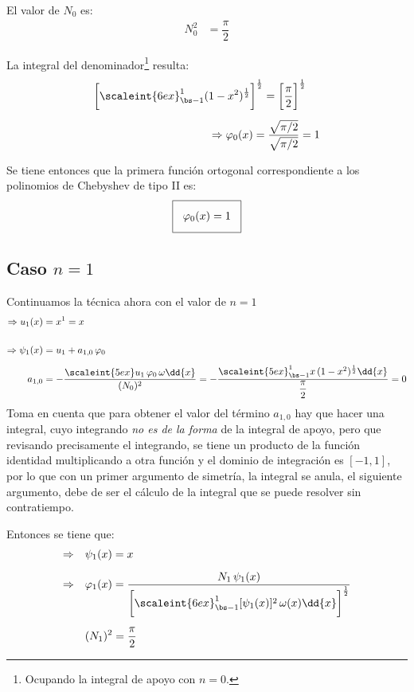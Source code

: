 El valor de $N_{0}$ es:
\begin{align*}
N_{0}^{2} &= \dfrac{\pi}{2}
\end{align*}

La integral del denominador\footnote{Ocupando la integral de apoyo con $n = 0$.} resulta:
\begin{align*}
\bigg[ \scaleint{6ex}_{\bs -1}^{1} (&1 - x^{2})^{\frac{1}{2}} \bigg]^{\frac{1}{2}} =  \bigg[ \dfrac{\pi}{2} \bigg]^{\frac{1}{2}} \\[0.5em] 
&\Rightarrow \varphi_{0}(x) =  \dfrac{\sqrt{\pi/2}}{\sqrt{\pi/2}} =  1
\end{align*}

Se tiene entonces que la primera función ortogonal correspondiente a los polinomios de Chebyshev de tipo II es:
\begin{align*}
\setlength{\fboxsep}{3\fboxsep}\boxed{
\varphi_{0} (x) = 1}
\end{align*}

\subsection{Caso \texorpdfstring{$n=1$}{n=1}}

Continuamos la técnica ahora con el valor de $n = 1$
\begin{align*}
\Rightarrow u_{1} (x) &= x^{1} = x \\[0.5cm] 
\Rightarrow \psi_{1} (x) &=  u_{1} + a_{1,0} \, \varphi_{0} \\[0.5em] 
a_{1,0} &= - \dfrac{\scaleint{5ex} u_{1} \, \varphi_{0} \, \omega \dd{x}}{(N_{0})^{2}} = 
- \dfrac{\scaleint{5ex}_{\bs -1}^{1} x \, (1 - x^{2})^{\frac{1}{2}} \dd{x}}{\dfrac{\pi}{2}} = 0
\end{align*}    
Toma en cuenta que para obtener el valor del término $a_{1, 0}$ hay que hacer una integral, cuyo integrando \emph{no es de la forma} de la integral de apoyo, pero que revisando precisamente el integrando, se tiene un producto de la función identidad multiplicando a otra función y el dominio de integración es $[-1, 1]$, por lo que con un primer argumento de simetría, la integral se anula, el siguiente argumento, debe de ser el cálculo de la integral que se puede resolver sin contratiempo.
\par
Entonces se tiene que:
\begin{align*}
\Rightarrow \quad &\psi_{1} (x) =  x \\[0.5em] 
\Rightarrow \quad &\varphi_{1} (x) = \dfrac{N_{1} \, \psi_{1} (x)}{\bigg[ \scaleint{6ex}_{\bs -1}^{1} [\psi_{1} (x)]^{2} \, \omega (x) \dd{x} \bigg]^{\frac{1}{2}}} \\[0.5em] 
&(N_{1})^{2} = \dfrac{\pi}{2}
\end{align*}    

